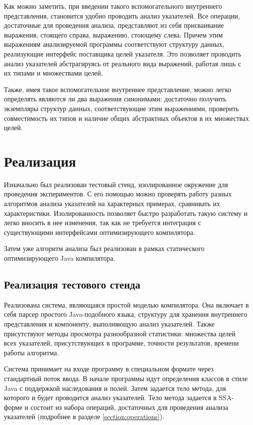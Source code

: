 \documentclass[14pt,titlepage]{extarticle}
\let\oldsection\section
\renewcommand{\section}{\newpage\oldsection}
\begin{document}
      Как можно заметить, при введении такого вспомогательного внутреннего
      представления, становится удобно проводить анализ указателей.
      Все операции, достаточные для проведения анализа, представляют из себя
      присваивание выражения, стоящего справа, выражению, стоющему слева.
      Причем этим выражениям анализируемой программы соответствуют структуру
      данных, реализующие интерфейс поставщика целей указателя. Это позволяет
      проводить анализ указателей абстрагируясь от реального вида выражений,
      работая лишь с их типами и множествами целей.

      Также, имея такое вспомогательное внутреннее представление, можно легко
      определять являются ли два выражения синонимами: достаточно получить
      экземпляры структур данных, соответствующие этим выражениями, проверить
      совместимость их типов и наличие общих абстрактных объектов в их
      множествах целей.

  \section{Реализация}

    Изначально был реализован тестовый стенд, изолированное окружение для
    проведения экспериментов. С его помощью можно проверять работу
    разных алгоритмов анализа указателей на характерных примерах, сравнивать их
    характеристики. Изолированность позволяет быстро разработать такую систему
    и легко вносить в нее изменения, так как не требуется интеграция с
    существующими интерфейсами оптимизирующего компилятора.

    Затем уже алгоритм анализа был реализован в рамках статического
    оптимизирующего Java компилятора.

    \subsection{Реализация тестового стенда}

      Реализована система, являющаяся простой моделью компилятора. Она включает
      в себя парсер простого Java-подобного языка, структуру для хранения
      внутреннего представления и компоненту, выполняющую анализ указателей.
      Также присутствуют методы просмотра разнообразной статистики: множества
      целей всех указателей, присутствующих в программе, точности результатов,
      времени работы алгоритма.

      Система принимает на входе программу в специальном формате через
      стандартный поток ввода. В начале программы идут определения классов в
      стиле Java с поддержкой наследования и полей. Затем задается тело метода,
      для которого и будет проводится анализ указателей.
      Тело метода задается в SSA-форме и состоит из набора операций,
      достаточных для проведения анализа указателей (подробнее в разделе
      \ref{section:operations}).
\end{document}
